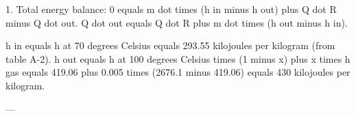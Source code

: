 1. Total energy balance:  
0 equals m dot times (h in minus h out) plus Q dot R minus Q dot out.  
Q dot out equals Q dot R plus m dot times (h out minus h in).  

h in equals h at 70 degrees Celsius equals 293.55 kilojoules per kilogram (from table A-2).  
h out equals h at 100 degrees Celsius times (1 minus x) plus x times h gas equals 419.06 plus 0.005 times (2676.1 minus 419.06) equals 430 kilojoules per kilogram.  

---